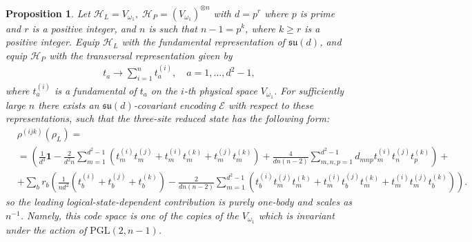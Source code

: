 \documentclass[11pt,letterpaper]{article}
\theoremstyle{plain}
\theoremstyle{plain}
\theoremstyle{plain}
\theoremstyle{plain}
\theoremstyle{plain}
\theoremstyle{plain}
\theoremstyle{plain}
\newtheorem{smproposition}[smtheorem]{Proposition}
\theoremstyle{definition}
\theoremstyle{plain}
\begin{document}
\begin{smproposition}\label{prop:3site-fundamental}
Let
    $
            \mathcal H_L=V_{\omega_1},\;
                    \mathcal H_P=(V_{\omega_1})^{\otimes n}
                        $
                            with $d=p^r$ where $p$ is prime and $r$ is a positive integer, 
                                and $n$ is such that $n-1=p^k$, where $k \geq r$ is a positive integer. 
                                    Equip \(\mathcal H_L\) with the fundamental representation of
                                        \(\mathfrak{su}(d)\), and equip \(\mathcal H_P\) with the transversal
                                            representation given by
                                                \begin{equation}
                                                    \begin{gathered}
                                                        t_a \rightarrow \sum_{i=1}^n t_a^{(i)}, \quad a=1,\ldots,d^2-1,
                                                            \end{gathered}
                                                                \end{equation} 
                                                                    where $t_a^{(i)}$ is a fundamental of $t_a$ on the $i$-th physical space $V_{\omega_1}$.
    For sufficiently
    large $n$ there exists an $\mathfrak{su}(d)$-covariant encoding $\mathcal{E}$ with respect to these representations, such that the three-site reduced state has the following form:
\begin{equation}\label{eq:main-3site-difference}
\begin{aligned}
    &\rho^{(ijk)}(\rho_L)=
    \\&=\left(\frac{1}{d^3} \mathbf{1}-\frac{2}{d^2 n} \sum_{m=1}^{d^2-1}\left(t_m^{(i)} t_m^{(j)}+t_m^{(i)} t_m^{(k)}+t_m^{(j)} t_m^{(k)}\right)+\frac{4}{d n(n-2)} \sum_{m, n, p=1}^{d^2-1} d_{m n p} t_m^{(i)} t_n^{(j)} t_p^{(k)}\right) +
    \\&+\sum_b r_b\left(\frac{1}{n d^2}\left(t_b^{(i)}+t_b^{(j)}+t_b^{(k)}\right)-\frac{2}{d n(n-2)} \sum_{m=1}^{d^2-1}\left(t_b^{(i)} t_m^{(j)} t_m^{(k)}+t_m^{(i)} t_b^{(j)} t_m^{(k)}+t_m^{(i)} t_m^{(j)} t_b^{(k)}\right)\right).
\end{aligned}
\end{equation}
so the leading logical-state-dependent contribution is purely one-body and scales as \(n^{-1}\). Namely, this code space is one of the copies of the $V_{\omega_1}$ which is invariant under the action of $\mathrm{PGL}(2, n-1)$.
\end{smproposition}
\end{document}
